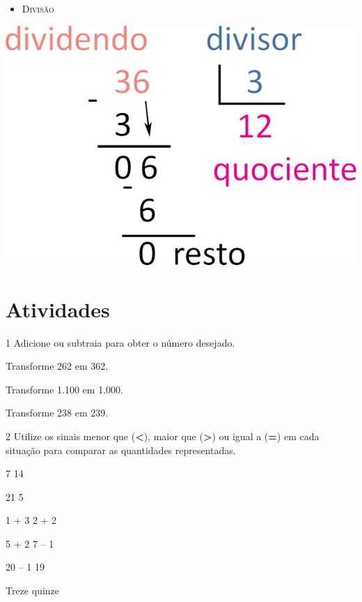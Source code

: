 {\begin{itemize}
\item [ ] \textsc{Divisão}
\end{itemize}

\begin{center}
\noindent\includegraphics[width=.4\textwidth]{./media/image13.png}
\end{center}
}

\pagebreak 

\section*{Atividades}

\num{1} Adicione ou subtraia para obter o número desejado.

\begin{escolha}

\item
  Transforme 262 em 362.\\

\item
  Transforme 1.100 em 1.000.\\

\item
  Transforme 238 em 239.\\
\end{escolha}

\num{2} Utilize os sinais menor que (\textbf{\textless{}}), maior que (\textbf{\textgreater{}}) ou igual a
(\textbf{=}) em cada situação para comparar as quantidades representadas.\bigskip

\begin{minipage}{.5\textwidth}
\begin{escolha}
\item
  7  14
\item
  21  5
\item
  1 + 3  2 + 2
  \end{escolha}
  \end{minipage}
\begin{minipage}{.5\textwidth}
  \begin{escolha}[start=4]
\item
  5 + 2  7 -- 1
\item
  20 -- 1  19
\item
  Treze  quinze
\end{escolha}
\end{minipage}

